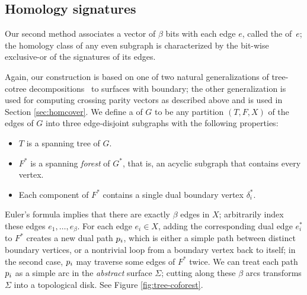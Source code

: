\subsection{Homology signatures}
\label{sec:characterizing_signatures}

Our second method associates a vector of $\beta$ bits with each edge $e$, called the  of~$e$; the homology class of any even subgraph is characterized by the bit-wise exclusive-or of the signatures of its edges.

Again, our construction is based on one of two natural generalizations of tree-cotree decompositions~\cite{e-dgteg-03} to surfaces with boundary; the other generalization is used for computing crossing parity vectors as described above and is used in Section \ref{sec:homcover}.
We define a  of $G$ to be any partition $(T, F, X)$ of the edges of $G$ into three edge-disjoint subgraphs with the following properties:
\begin{itemize}\itemsep0pt
\item $T$ is a spanning tree of $G$.
\item $F^*$ is a spanning \emph{forest} of $G^*$, that is, an acyclic subgraph that contains every vertex.
\item Each component of $F^*$ contains a single dual boundary vertex $\delta_i^*$.
\end{itemize}
Euler's formula implies that there are exactly $\beta$ edges in $X$; arbitrarily index these edges $e_1, \dots, e_\beta$.  For each edge $e_i\in X$, adding the corresponding dual edge $e_i^*$ to $F^*$ creates a new dual path $p_i$, which is either a simple path between distinct boundary vertices, or a nontrivial loop from a boundary vertex back to itself; in the second case, $p_i$ may traverse some edges of $F^*$ twice.  We can treat each path $p_i$ as a simple arc in the \emph{abstract} surface $\Sigma$; cutting along these $\beta$ arcs transforms $\Sigma$ into a topological disk.
See Figure \ref{fig:tree-coforest}.

